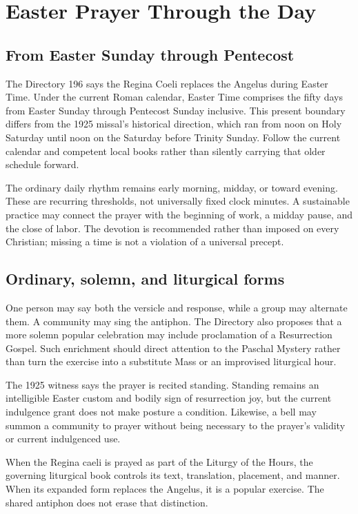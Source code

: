 \section{Easter Prayer Through the Day}

\subsection{From Easter Sunday through Pentecost}

The Directory 196 says the Regina Coeli replaces the Angelus during Easter Time. Under the current Roman calendar, Easter Time comprises the fifty days from Easter Sunday through Pentecost Sunday inclusive. This present boundary differs from the 1925 missal's historical direction, which ran from noon on Holy Saturday until noon on the Saturday before Trinity Sunday. Follow the current calendar and competent local books rather than silently carrying that older schedule forward.

The ordinary daily rhythm remains early morning, midday, or toward evening. These are recurring thresholds, not universally fixed clock minutes. A sustainable practice may connect the prayer with the beginning of work, a midday pause, and the close of labor. The devotion is recommended rather than imposed on every Christian; missing a time is not a violation of a universal precept.

\subsection{Ordinary, solemn, and liturgical forms}

One person may say both the versicle and response, while a group may alternate them. A community may sing the antiphon. The Directory also proposes that a more solemn popular celebration may include proclamation of a Resurrection Gospel. Such enrichment should direct attention to the Paschal Mystery rather than turn the exercise into a substitute Mass or an improvised liturgical hour.

The 1925 witness says the prayer is recited standing. Standing remains an intelligible Easter custom and bodily sign of resurrection joy, but the current indulgence grant does not make posture a condition. Likewise, a bell may summon a community to prayer without being necessary to the prayer's validity or current indulgenced use.

When the Regina caeli is prayed as part of the Liturgy of the Hours, the governing liturgical book controls its text, translation, placement, and manner. When its expanded form replaces the Angelus, it is a popular exercise. The shared antiphon does not erase that distinction.

